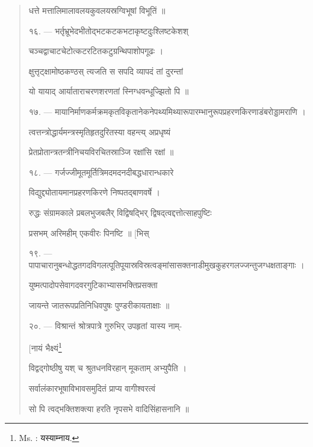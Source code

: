 \documentclass[a4paper, 11pt, oneside, french]{article}
\begin{document}
\begin{quotation}
\texthindi{धत्ते मत्तालिमालावलयकुवलयस्रग्विभूषां विभूतिं ॥}

\bigskip

\texthindi{१६}. --- \texthindi{भर्तृभ्रूभेदभीतोद्भटकटकभटाकृष्टदुःश्लिष्टकेशश्}

\texthindi{चञ्चद्वाचाटचेटोत्कटरटितकटुग्रन्थिपाशोपगूढः ।}

\texthindi{क्षुत्तृट्क्षामोष्ठकण्ठस् त्यजति स सपदि व्यापदं तां दुरन्तां}

\texthindi{यो यायाद् आर्याताराचरणशरणतां स्निग्धवन्धूज्झितो पि ॥}

\bigskip

\texthindi{१७}. --- \texthindi{मायानिर्माणकर्मक्रमकृतविकृतानेकनेपथ्यमिथ्यारूपारम्भानुरूपप्रहरणकिरणाडंबरोड्डामराणि ।}

\texthindi{त्वत्तन्त्रोद्धार्यमन्त्रस्मृतिहृतदुरितस्या वहन्त्य् अप्रधृष्यं}

\texthindi{प्रेतप्रोतान्त्रतन्त्रीनिचयविरचितस्राञ्जि रक्षांसि रक्षां ॥}

\bigskip

\texthindi{१८}. --- \texthindi{गर्जज्जीमूतमूर्तित्रिमदमदनदीबद्धधारान्धकारे}

\texthindi{विद्युद्द्योतायमानप्रहरणकिरणे निष्पतद्बाणवर्षे ।}

\texthindi{रुद्धः संग्रामकाले प्रबलभुजबलैर् विद्विषद्भिर् द्विषद्त्वद्दत्तोत्साहपुष्टिः}

\texthindi{प्रसभम् अरिमहीम् एकवीरः पिनष्टि ॥ [भिस्}

\bigskip

\texthindi{१९}. --- \texthindi{पापाचारानुबन्धोद्धतगदविगलत्पूतिपूयास्रविस्रत्वङ्मांसासक्तनाडीमुखकुहरगलज्जन्तुजग्धक्षताङ्गाः ।}

\texthindi{युष्मत्पादोपसेवागदवरगुटिकाभ्यासभक्तिप्रसक्ता}

\texthindi{जायन्ते जातरूपप्रतिनिधिवपुषः पुण्डरीकायताक्षाः ॥}

\bigskip

\texthindi{२०}. --- \texthindi{विश्रान्तं श्रोत्रपात्रे गुरुभिर् उपहृतां यास्य नाम्-}

\hspace*{65mm}\texthindi{[नायं भैक्ष्यं}\footnote{Ms. : \texthindi{यस्याम्नाय.}}

\texthindi{विद्वद्गोष्ठीषु यश् च श्रुतधनविरहान् मूकताम् अभ्युपैति ।}

\texthindi{सर्वालंकारभूषाविभावसमुदितं प्राप्य वागीश्वरत्वं}

\texthindi{सो पि त्वद्भक्तिशक्त्या हरति नृपसभे वादिसिंहासनानि ॥}

\bigskip


\end{quotation}
\end{document}

